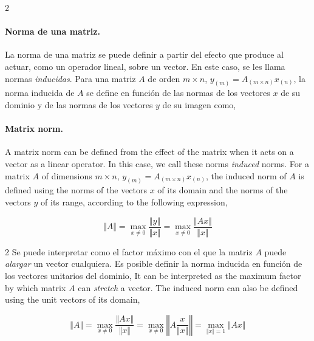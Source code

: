 \begin{paracol}{2}
\paragraph{Norma de una matriz.} La norma de una matriz se puede definir a partir del efecto que produce al actuar, como un operador lineal, sobre un vector. En este caso, se les llama normas \emph{inducidas}. Para una matriz $A$ de orden $m\times n$, $y_{(m)}=A_{(m\times n)}x_{(n)}$, la norma inducida de $A$ se define en función de las normas de los vectores $x$ de su dominio y de las normas de los vectores $y$ de su imagen como,
\switchcolumn
\paragraph{Matrix norm.} A matrix norm can be defined from the effect of the matrix when it acts on a vector as a linear operator. In this case, we call these norms \emph{induced} norms. For a matrix $A$ of dimensions $m\times n$, $y_{(m)} =A_{(m\times n)}x_{(n)}$, the induced norm of $A$ is defined using the norms of the vectors $x$ of its domain and the norms of the vectors $y$ of its range, according to the following expression,   
\end{paracol}
\begin{equation*}
\Vert A \Vert =\max_{x \neq 0} \frac{\Vert y \Vert}{\Vert x \Vert}=\max_{x \neq 0} \frac{\Vert Ax \Vert}{\Vert x \Vert}
\end{equation*}

\begin{paracol}{2}
Se puede interpretar como el factor máximo con el que la matriz $A$ puede \emph{alargar} un vector cualquiera. Es posible definir la norma inducida en función de los vectores unitarios del dominio,
\switchcolumn
It can be interpreted as the maximum factor by which matrix $A$ can \emph{stretch} a vector. The induced norm can also be defined using the unit vectors of its domain,

\end{paracol}
\begin{equation*}
\Vert A \Vert =\max_{x \neq 0} \frac{\Vert Ax \Vert}{\Vert x \Vert}= \max_{x \neq 0} \left\Vert A\frac{x}{\Vert x \Vert} \right\Vert= \max_{\Vert x \Vert =1}\Vert Ax \Vert
\end{equation*}

